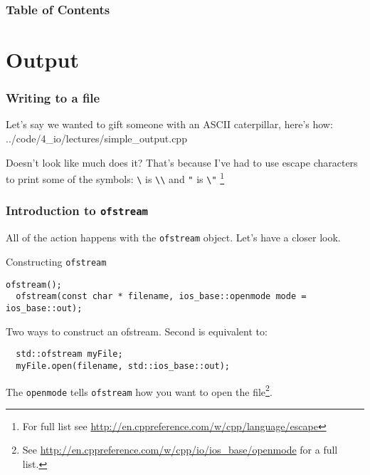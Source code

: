 \documentclass[handout]{beamer}
\subtitle{Session 4: Input, output and text manipulation}
\begin{document}
\frame{\titlepage}

\begin{frame}
\frametitle{Table of Contents}
\tableofcontents
\end{frame}

\section{Output}

\begin{frame}[fragile]
  \frametitle{Writing to a file}
  
  Let's say we wanted to gift someone with an ASCII caterpillar, here's how:
  \pause
  	{../code/4_io/lectures/simple_output.cpp}

  Doesn't look like much does it?  That's because I've had to use escape characters to print some of the symbols:
  	\texttt{\textbackslash} is \texttt{\textbackslash\textbackslash} and
  	\texttt{"}  is \texttt{\textbackslash"} \footnote{For full list see \url{http://en.cppreference.com/w/cpp/language/escape}}

\end{frame}

\begin{frame}[fragile]
  \frametitle{Introduction to  \texttt{ofstream}}
  
  All of the action happens with the \texttt{ofstream} object.  Let's have a closer look.
  \pause
  \begin{block}{Constructing \texttt{ofstream}}
    \begin{lstlisting}[aboveskip=0pt]
  ofstream();
  ofstream(const char * filename, ios_base::openmode mode = ios_base::out);
    \end{lstlisting}
  Two ways to construct an ofstream.  Second is equivalent to:
    \begin{lstlisting}
  std::ofstream myFile;
  myFile.open(filename, std::ios_base::out);
    \end{lstlisting}
    The \texttt{openmode} tells \texttt{ofstream} how you want to open the file\footnote{See \url{http://en.cppreference.com/w/cpp/io/ios_base/openmode} for a full list.}.
  \end{block}

\end{frame}
\end{document}
